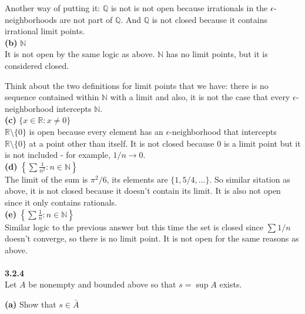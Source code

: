 Another way of putting it: $\mathbb{Q}$ is not is not open because irrationals in the $\epsilon$-neighborhoods
are not part of $\mathbb{Q}$. And $\mathbb{Q}$ is not closed because it contains irrational limit points.
\\

\textbf{(b)} $\mathbb{N}$
\\

It is not open by the same logic as above.
$\mathbb{N}$ has no limit points, but it is considered closed.

Think about the two definitions for limit points that we have: there is no sequence contained within $\mathbb{N}$
with a limit and also, it is not the case that every $\epsilon$-neighborhood intercepts $\mathbb{N}$.
\\

\textbf{(c)} $\{ x\in\mathbb{R} : x \neq 0 \}$
\\

$\mathbb{R} \setminus \{0\}$ is open because every element has an $\epsilon$-neighborhood that intercepts
$\mathbb{R} \setminus \{0\}$ at a point other than itself.
It is not closed because 0 is a limit point but it is not included - for example, $1/n \rightarrow 0$.
\\

\textbf{(d)} $\left\{ \sum \frac{1}{n^2} : n\in\mathbb{N} \right\}$
\\

The limit of the sum is $\pi^2 / 6$, its elements are $\{1, 5/4, \ldots \}$.
So similar sitation as above, it is not closed because it doesn't contain its limit.
It is also not open since it only contains rationals.
\\

\textbf{(e)} $\left\{ \sum \frac{1}{n} : n\in\mathbb{N} \right\}$
\\
Similar logic to the previous answer but this time the set is closed since $\sum 1/n$ doesn't converge,
so there is no limit point.
It is not open for the same reasons  as above.
\\~\\



\label{abbott:3.2.4}
\textbf{3.2.4}
\\

Let $A$ be nonempty and bounded above so that $s = \sup A$ exists.

\textbf{(a)} Show that $s\in \bar{A}$
\\

